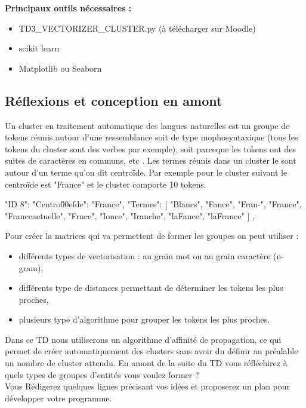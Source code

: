 \textbf{Principaux outils nécessaires :}
\begin{itemize}
\item TD3\_VECTORIZER\_CLUSTER.py (à télécharger sur Moodle)
  \item scikit learn
  \item Matplotlib ou Seaborn
  
\end{itemize}

\vspace{0.5cm}
\subsection{Réflexions et conception en amont}
\vspace{0.5cm}
\label{sec:amont}

Un cluster en traitement automatique des langues naturelles est un groupe de tokens réunis autour d'une ressemblance soit de type mophosyntaxique (tous les tokens du cluster sont des verbes par exemple), soit parceque les tokens ont des suites de caractères en communs, etc . Les termes réunis dans un cluster le sont autour d'un terme qu'on dit centroïde. 
Par exemple pour le cluster suivant le centroïde est "France" et le cluster comporte 10 tokens.

\begin{python}
"ID 8": {
    "Centro\u00efde": "France",
    "Termes": [
      "Blancs",
      "Fance",
      "Fran-",
      "France",
      "Franceaetuelle",
      "Frnce",
      "Ionce",
      "Iranche",
      "laFance",
      "laFrance"
    ]
  },
  
\end{python}

Pour créer la matrices qui va permettent de former les groupes on peut utiliser :
\begin{itemize}
\item différents types de vectorisation : au grain mot ou au grain caractère (n-gram),
\item différents type de distances permettant de déterminer les tokens les plus proches,
\item plusieurs type d'algorithme pour grouper les tokens les plus proches.
\end{itemize}

Dans ce TD nous utiliserons un algorithme d'affinité de propagation, ce qui permet de créer automatiquement des clusters sans avoir du définir au préalable un nombre de cluster attendu. 
\newline
En amont de la suite du TD vous réfléchirez à quels types de groupes d'entités vous voulez former ?\\
Vous Rédigerez quelques lignes précisant vos idées et proposerez un plan pour développer votre programme.

